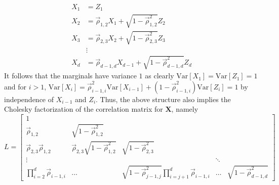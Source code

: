 \documentclass[../Thesis.tex]{subfiles}
\begin{document}
\begin{equation}\label{eq:Gaussian chain def}
    \begin{split}
        X_1 & = Z_1                                                                  \\
        X_2 & = \vec{\rho}_{1,2} X_1 + \sqrt{1 - \vec{\rho}_{1,2}^2} Z_2             \\
        X_3 & = \vec{\rho}_{2,3} X_2 + \sqrt{1 - \vec{\rho}_{2,3}^2} Z_3             \\
            & \vdots                                                                 \\
        X_d & = \vec{\rho}_{d-1, d} X_{d-1} + \sqrt{1 - \vec{\rho}_{d-1, d}^2} Z_{d}
    \end{split}
\end{equation}
It follows that the marginals have variance $1$ as clearly $\text{Var} \left[X_1\right] = \text{Var}\left[Z_1\right] = 1$ and for $i > 1$, $\text{Var}\left[X_i\right] = \vec{\rho}_{i-1,i}^2 \text{Var}\left[X_{i-1}\right] + \left(1 - \vec{\rho}_{i-1,i}^2\right) \text{Var} \left[Z_i\right] = 1$ by independence of $X_{i-1}$ and $Z_i$. Thus, the above structure also implies the Cholesky factorization of the correlation matrix for $\boldsymbol X$, namely
$$L = \begin{bmatrix}
        1                                &                                               &                                                                    &        &                                \\
        \vec{\rho}_{1,2}                 & \sqrt{1 - \vec{\rho}_{1,2}^2}                 &                                                                    &        &                                \\
        \vec{\rho}_{2,3}\vec{\rho}_{1,2} & \vec{\rho}_{2,3}\sqrt{1 - \vec{\rho}_{1,2}^2} & \sqrt{1 - \vec{\rho}_{2,3}^2}                                      &        &                                \\
        \vdots                           &                                               &                                                                    & \ddots &                                \\
        \prod_{i=2}^d \vec{\rho}_{i-1,i} & \dots                                         & \sqrt{1 - \vec{\rho}_{j-1,j}^2} \prod_{i=j+1}^d \vec{\rho}_{i-1,i} & \dots  & \sqrt{1- \vec{\rho}_{d-1,d}^2}
    \end{bmatrix}$$
\end{document}
